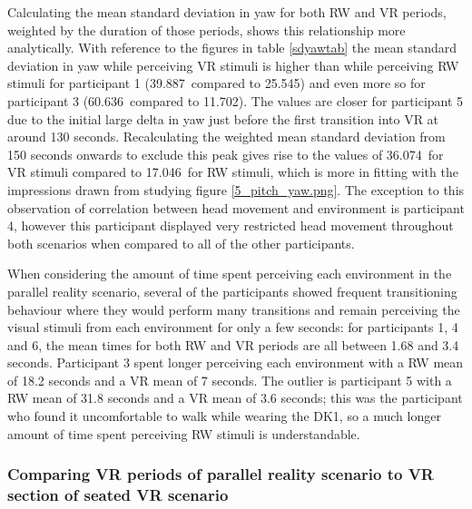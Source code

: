 Calculating the mean standard deviation in yaw for both RW and VR periods, weighted by the duration of those periods, shows this relationship more analytically. With reference to the figures in table \ref{sdyawtab} the mean standard deviation in yaw while perceiving VR stimuli is higher than while perceiving RW stimuli for participant 1 (39.887\textdegree\ compared to 25.545\textdegree) and even more so for participant 3 (60.636\textdegree\ compared to 11.702\textdegree). The values are closer for participant 5 due to the initial large delta in yaw just before the first transition into VR at around 130 seconds. Recalculating the weighted mean standard deviation from 150 seconds onwards to exclude this peak gives rise to the values of 36.074\textdegree\ for VR stimuli compared to 17.046\textdegree\ for RW stimuli, which is more in fitting with the impressions drawn from studying figure \ref{5_pitch_yaw.png}. The exception to this observation of correlation between head movement and environment is participant 4, however this participant displayed very restricted head movement throughout both scenarios when compared to all of the other participants.

When considering the amount of time spent perceiving each environment in the parallel reality scenario, several of the participants showed frequent transitioning behaviour where they would perform many transitions and remain perceiving the visual stimuli from each environment for only a few seconds: for participants 1, 4 and 6, the mean times for both RW and VR periods are all between 1.68 and 3.4 seconds. Participant 3 spent longer perceiving each environment with a RW mean of 18.2 seconds and a VR mean of 7 seconds. The outlier is participant 5 with a RW mean of 31.8 seconds and a VR mean of 3.6 seconds; this was the participant who found it uncomfortable to walk while wearing the DK1, so a much longer amount of time spent perceiving RW stimuli is understandable.

\subsubsection{Comparing VR periods of parallel reality scenario to VR section of seated VR scenario}

